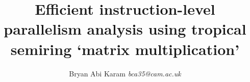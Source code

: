 \documentclass[a4paper]{report}
\theoremstyle{definition}
\begin{document}
\title{Efficient instruction-level parallelism analysis using tropical semiring \lq{matrix multiplication\rq}}
\author{\small{ Bryan Abi Karam \textit{bca35@cam.ac.uk} }}
\maketitle

\tableofcontents







{}

\end{document}

